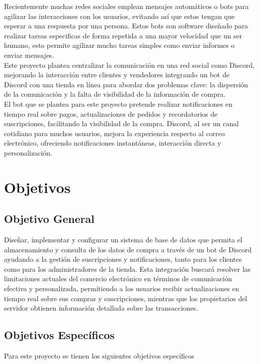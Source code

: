 \documentclass[a4paper,12pt]{article}
\begin{document}
Recientemente muchas redes sociales emplean mensajes automáticos o bots para agilizar las interacciones con los usuarios, evitando así que estos tengan que esperar a una respuesta por una persona. Estos bots son software diseñado para realizar tareas especificas de forma repetida a una mayor velocidad que un ser humano, esto permite agilizar mucho tareas simples como enviar informes o enviar mensajes.\\

 Este proyecto plantea centralizar la comunicación en una red social como Discord, mejorando la interacción entre clientes y vendedores integrando un bot de Discord con una tienda en línea para abordar dos problemas clave: la dispersión de la comunicación y la falta de visibilidad de la información de compra.\\
 
El bot que se plantea para este proyecto pretende realizar notificaciones en tiempo real sobre pagos, actualizaciones de pedidos y recordatorios de suscripciones, facilitando la visibilidad de la compra. Discord, al ser un canal cotidiano para muchos usuarios, mejora la experiencia respecto al correo electrónico, ofreciendo notificaciones instantáneas, interacción directa y personalización.\\

\newpage

\section{Objetivos}
\subsection{Objetivo General}
Diseñar, implementar y configurar un sistema de base de datos que permita el almacenamiento y consulta de los datos de compra a través de un bot de Discord ayudando a la gestión de suscripciones y notificaciones, tanto para los clientes como para los administradores de la tienda. Esta integración buscará resolver las limitaciones actuales del comercio electrónico en términos de comunicación efectiva y personalizada, permitiendo a los usuarios recibir actualizaciones en tiempo real sobre sus compras y suscripciones, mientras que los propietarios del servidor obtienen información detallada sobre las transacciones. \\

\subsection{Objetivos Específicos}
Para este proyecto se tienen los siguientes objetivos específicos \\
\end{document}
